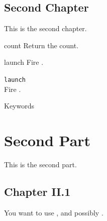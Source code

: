 \documentclass[openright,twoside,11pt]{book}
\begin{document}
\chapter{Second Chapter}

This is the second chapter.



\begin{urbiscriptapi}
\item[count] Return the count.
\item[launch]
  Fire \this.
\item \lstinline|launch|~\\
  Fire \this.
\end{urbiscriptapi}


\renewcommand{\baselinestretch}{.85}
\begin{table}[\floatpos]
  \centering
    
  \caption{Keywords}
  \label{tab:keywords}
\end{table}
\renewcommand{\baselinestretch}{1}



\let\sectionOrig\section
\renewcommand{\section}[1]{\clearpage\sectionObject{#1}}

\let\section\sectionOrig


\part{Second Part}
\label{sec:second}
This is the second part.

\chapter{Chapter II.1}

You want to use , and possibly .


\nocite{*}

\chapterIndex
\end{document}
